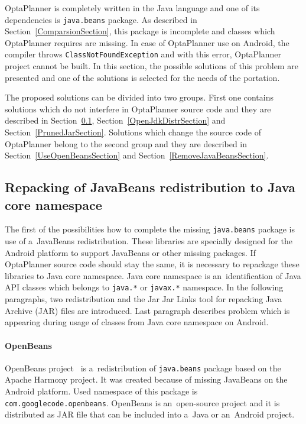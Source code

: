 OptaPlanner is completely written in the Java language and one of its dependencies is \texttt{java.beans} package. As
described in Section~\ref{ComparsionSection}, this package is incomplete and classes which OptaPlanner requires are
missing. In case of OptaPlanner use on Android, the compiler throws \texttt{ClassNotFoundException} and with this error,
OptaPlanner project cannot be built. In this section, the possible solutions of this problem are presented and one of
the solutions is selected for the needs of the portation.

The proposed solutions can be divided into two groups. First one contains solutions which do not interfere in
OptaPlanner source code and they are described in Section~\ref{RepackingJavaBeansSection},
Section~\ref{OpenJdkDistrSection} and Section~\ref{PrunedJarSection}. Solutions which change the source code of
OptaPlanner belong to the second group and they are described in Section~\ref{UseOpenBeansSection} and
Section~\ref{RemoveJavaBeansSection}.

\subsection{Repacking of JavaBeans redistribution to Java core namespace}\label{RepackingJavaBeansSection}
The first of the possibilities how to complete the missing \texttt{java.beans} package is use of a~JavaBeans
redistribution. These libraries are specially designed for the Android platform to support JavaBeans or other missing
packages. If OptaPlanner source code should stay the same, it is necessary to repackage these libraries to Java core
namespace. Java core namespace is an~identification of Java API classes which belongs to \texttt{java.*} or
\texttt{javax.*} namespace. In the following paragraphs, two redistribution and the Jar Jar Links tool for repacking
Java Archive (JAR) files are introduced. Last paragraph describes problem which is appearing during usage of classes
from Java core namespace on Android.

\paragraph{OpenBeans}
OpenBeans project~\cite{OpenBeans} is a~redistribution of \texttt{java.beans} package based on the Apache Harmony
project. It was created because of missing JavaBeans on the Android platform. Used namespace of this package is
\texttt{com.googlecode.openbeans}. OpenBeans is an~open-source project and it is distributed as JAR file that can be
included into a~Java or an~Android project.

